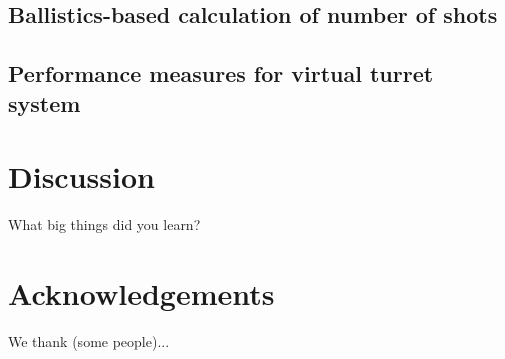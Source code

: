 \documentclass{article}
\begin{document}
\subsection{Ballistics-based calculation of number of shots}
\subsection{Performance measures for virtual turret system}

\section{Discussion}
What big things did you learn? 

\section{Acknowledgements}
We thank (some people)...



\appendix

\end{document}
